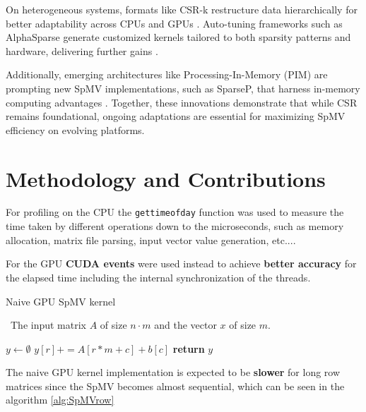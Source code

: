 \documentclass[conference]{IEEEtran}
\begin{document}
    On heterogeneous systems, formats like CSR-k restructure data
    hierarchically for better adaptability across CPUs and GPUs
    \cite{liu2022csrk}.
    Auto-tuning frameworks such as AlphaSparse generate customized kernels
    tailored to both sparsity patterns and hardware, delivering further gains
    \cite{yin2022alphasparse}.

    Additionally, emerging architectures like Processing-In-Memory (PIM) are
    prompting new SpMV implementations, such as SparseP, that harness in-memory
    computing advantages \cite{lee2022sparsep}.
    Together, these innovations demonstrate that while CSR remains foundational,
    ongoing adaptations are essential for maximizing SpMV efficiency on
    evolving platforms.

    \section{Methodology and Contributions}\label{sec:methodology}

    For profiling on the CPU the \texttt{gettimeofday} function was used to
    measure the time taken by different operations down to the microseconds,
    such as memory allocation, matrix file parsing, input vector value generation,
    etc....

    For the GPU \textbf{CUDA events} were used instead to achieve
    \textbf{better accuracy} for the elapsed time including the internal
    synchronization of the threads.

    \begin{algorithm}[h!]
        \caption{Naive GPU SpMV kernel}
        \algorithmicrequire~The input matrix $A$ of size $n \cdot m$ and the vector $x$ of size $m$.
        \begin{algorithmic}[1]
                \State $y \gets \emptyset$
                        \State $y[r] += A[r * m + c] + b[c]$
                    \EndFor
                \EndFor
                \State \textbf{return} $y$
            \EndProcedure
        \end{algorithmic}
        \label{alg:SpMVrow}
    \end{algorithm}
    The naive GPU kernel implementation is expected to be \textbf{slower} for
    long row matrices since the SpMV becomes almost sequential, which can be
    seen in the algorithm \ref{alg:SpMVrow}
\end{document}
